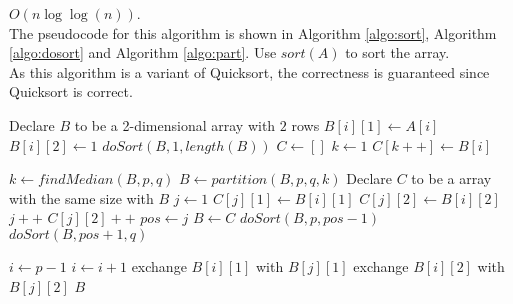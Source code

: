 \documentclass[letterpaper, 11pt]{article}
\begin{document}
$O(n\log\log(n))$.\\
The pseudocode for this algorithm is shown in Algorithm \ref{algo:sort}, Algorithm \ref{algo:dosort} and Algorithm \ref{algo:part}. Use $sort(A)$ to sort the array. \\
As this algorithm is a variant of Quicksort, the correctness is guaranteed since Quicksort is correct. \\
\begin{algorithm}
    \caption{$sort(A)$}
    \label{algo:sort}
    \begin{algorithmic}[1]
        \STATE Declare $B$ to be a 2-dimensional array with $2$ rows
            \STATE $B[i][1] \leftarrow A[i]$
            \STATE $B[i][2] \leftarrow 1$
        \ENDFOR
        \STATE $doSort(B, 1, length(B))$
        \STATE $C \leftarrow []$
        \STATE $k \leftarrow 1$
                \STATE $C[k++] \leftarrow B[i]$ 
            \ENDFOR
        \ENDFOR
    \end{algorithmic}
\end{algorithm}

\begin{algorithm}
    \caption{$doSort(B, p, q)$}
    \label{algo:dosort}
    \begin{algorithmic}[1]
        \STATE $k \leftarrow findMedian(B, p, q)$ 
        \STATE $B \leftarrow partition(B, p, q, k)$
        \STATE Declare $C$ to be a array with the same size with $B$
        \STATE $j \leftarrow 1$
                \STATE $C[j][1] \leftarrow B[i][1]$
                \STATE $C[j][2] \leftarrow B[i][2]$
                \STATE $j++$
            \ELSE
                \STATE $C[j][2]++$ 
                \STATE $pos \leftarrow j$
            \ENDIF
        \ENDFOR
        \STATE $B \leftarrow C$
        \STATE $doSort(B, p, pos - 1)$
        \STATE $doSort(B, pos + 1, q)$
    \end{algorithmic}
\end{algorithm}

\begin{algorithm}
    \caption{$partition(B, p, q, k)$}
    \label{algo:part}
    \begin{algorithmic}[1]
        \STATE $i \leftarrow p - 1$
                \STATE $i \leftarrow i + 1$
                \STATE exchange $B[i][1]$ with $B[j][1]$
                \STATE exchange $B[i][2]$ with $B[j][2]$
            \ENDIF
        \ENDFOR
        \RETURN $B$
    \end{algorithmic}
\end{algorithm}
\end{document}
